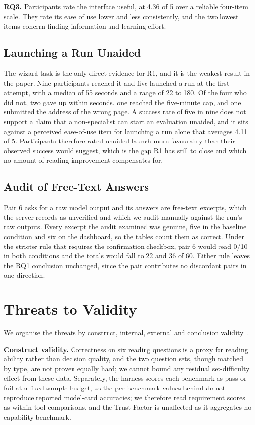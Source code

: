 \documentclass[10pt,conference]{IEEEtran}
\providecommand{\rqbox}[2]{%
  \begin{tcolorbox}[
    colback=green!10,
    colframe=rqgreen,
    arc=1mm,
    boxrule=0.5pt,
    left=1mm,
    right=1mm,
    top=0.5mm,
    bottom=0.5mm,
    before skip=4pt,
    after skip=4pt
  ]
  \textbf{#1.} #2
  \end{tcolorbox}%
}
\begin{document}
\rqbox{RQ3}{Participants rate the interface useful, at 4.36 of 5 over a reliable four-item scale. They rate its ease of use lower and less consistently, and the two lowest items concern finding information and learning effort.}

\subsection{Launching a Run Unaided}
The wizard task is the only direct evidence for R1, and it is the weakest result in the paper.
Nine participants reached it and five launched a run at the first attempt, with a median of 55 seconds and a range of 22 to 180.
Of the four who did not, two gave up within seconds, one reached the five-minute cap, and one submitted the address of the wrong page.
A success rate of five in nine does not support a claim that a non-specialist can start an evaluation unaided, and it sits against a perceived ease-of-use item for launching a run alone that averages 4.11 of 5.
Participants therefore rated unaided launch more favourably than their observed success would suggest, which is the gap R1 has still to close and which no amount of reading improvement compensates for.

\subsection{Audit of Free-Text Answers}
Pair 6 asks for a raw model output and its answers are free-text excerpts, which the server records as unverified and which we audit manually against the run's raw outputs.
Every excerpt the audit examined was genuine, five in the baseline condition and six on the dashboard, so the tables count them as correct.
Under the stricter rule that requires the confirmation checkbox, pair 6 would read 0/10 in both conditions and the totals would fall to 22 and 36 of 60.
Either rule leaves the RQ1 conclusion unchanged, since the pair contributes no discordant pairs in one direction.

\section{Threats to Validity}
\label{sec:threats}
We organise the threats by construct, internal, external and conclusion validity~\cite{wohlin2012experimentation}.

\textbf{Construct validity.}
Correctness on six reading questions is a proxy for reading ability rather than decision quality, and the two question sets, though matched by type, are not proven equally hard; we cannot bound any residual set-difficulty effect from these data. Separately, the harness scores each benchmark as pass or fail at a fixed sample budget, so the per-benchmark values behind  do not reproduce reported model-card accuracies; we therefore read requirement scores as within-tool comparisons, and the Trust Factor is unaffected as it aggregates no capability benchmark.
\end{document}
